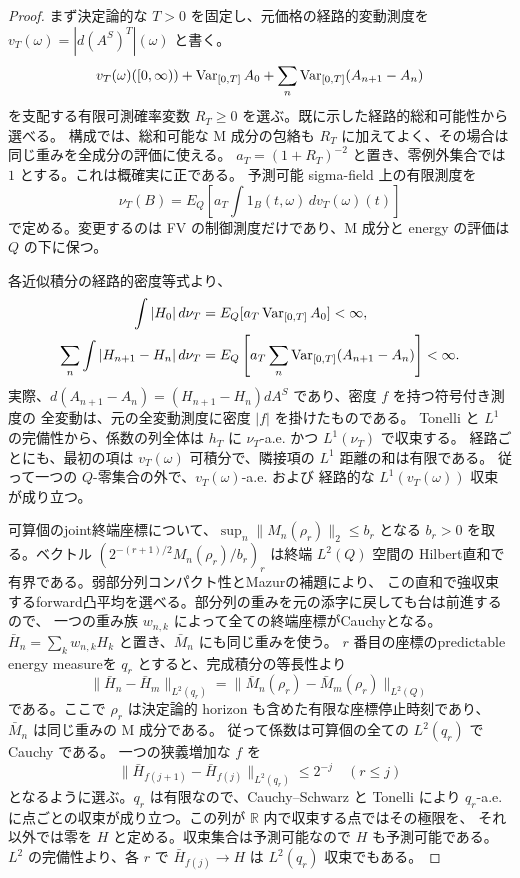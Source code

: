 \begin{proof}
まず決定論的な $T>0$ を固定し、元価格の経路的変動測度を
$v_T(\omega)=|d(A^S)^T|(\omega)$ と書く。
\[
 v_T(\omega)([0,\infty))+\operatorname{Var}_{[0,T]}A_0+
 \sum_n\operatorname{Var}_{[0,T]}(A_{n+1}-A_n)
\]
を支配する有限可測確率変数 $R_T\geq0$ を選ぶ。既に示した経路的総和可能性から選べる。
構成では、総和可能な M 成分の包絡も $R_T$ に加えてよく、その場合は同じ重みを全成分の評価に使える。
$a_T=(1+R_T)^{-2}$ と置き、零例外集合では $1$ とする。これは概確実に正である。
予測可能 sigma-field 上の有限測度を
\[
 \nu_T(B)=E_Q\left[a_T\int1_B(t,\omega)\,dv_T(\omega)(t)\right]
\]
で定める。変更するのは FV の制御測度だけであり、M 成分と energy の評価は $Q$ の下に保つ。

各近似積分の経路的密度等式より、
\[
 \begin{aligned}
 \int|H_0|\,d\nu_T&=E_Q[a_T\operatorname{Var}_{[0,T]}A_0]<\infty,\\
 \sum_n\int|H_{n+1}-H_n|\,d\nu_T
 &=E_Q\left[a_T\sum_n\operatorname{Var}_{[0,T]}(A_{n+1}-A_n)\right]<\infty.
 \end{aligned}
\]
実際、$d(A_{n+1}-A_n)=(H_{n+1}-H_n)dA^S$ であり、密度 $f$ を持つ符号付き測度の
全変動は、元の全変動測度に密度 $|f|$ を掛けたものである。
Tonelli と $L^1$ の完備性から、係数の列全体は $h_T$ に
$\nu_T$-a.e. かつ $L^1(\nu_T)$ で収束する。
経路ごとにも、最初の項は $v_T(\omega)$ 可積分で、隣接項の $L^1$ 距離の和は有限である。
従って一つの $Q$-零集合の外で、$v_T(\omega)$-a.e. および
経路的な $L^1(v_T(\omega))$ 収束が成り立つ。

可算個のjoint終端座標について、$\sup_n\|M_n(\rho_r)\|_2\leq b_r$ となる
$b_r>0$ を取る。ベクトル $(2^{-(r+1)/2}M_n(\rho_r)/b_r)_r$ は終端 $L^2(Q)$ 空間の
Hilbert直和で有界である。弱部分列コンパクト性とMazurの補題により、
この直和で強収束するforward凸平均を選べる。部分列の重みを元の添字に戻しても台は前進するので、
一つの重み族 $w_{n,k}$ によって全ての終端座標がCauchyとなる。
$\bar H_n=\sum_kw_{n,k}H_k$ と置き、$\bar M_n$ にも同じ重みを使う。
$r$ 番目の座標のpredictable energy measureを $q_r$ とすると、完成積分の等長性より
\[
 \|\bar H_n-\bar H_m\|_{L^2(q_r)}
 =\|\bar M_n(\rho_r)-\bar M_m(\rho_r)\|_{L^2(Q)}
\]
である。ここで $\rho_r$ は決定論的 horizon も含めた有限な座標停止時刻であり、
$\bar M_n$ は同じ重みの M 成分である。
従って係数は可算個の全ての $L^2(q_r)$ で Cauchy である。
一つの狭義増加な $f$ を
\[
 \|\bar H_{f(j+1)}-\bar H_{f(j)}\|_{L^2(q_r)}\leq2^{-j}
 \quad(r\leq j)
\]
となるように選ぶ。$q_r$ は有限なので、Cauchy--Schwarz と Tonelli により
$q_r$-a.e. に点ごとの収束が成り立つ。この列が $\mathbb R$ 内で収束する点ではその極限を、
それ以外では零を $H$ と定める。収束集合は予測可能なので $H$ も予測可能である。
$L^2$ の完備性より、各 $r$ で $\bar H_{f(j)}\to H$ は $L^2(q_r)$ 収束でもある。


\end{proof}
